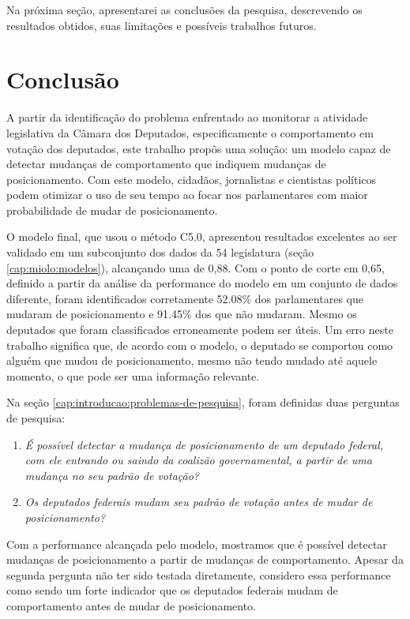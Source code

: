 \documentclass[a4paper,titlepage]{ppgi}\usepackage[]{graphicx}\usepackage[]{color}
\begin{document}
Na próxima seção, apresentarei as conclusões da pesquisa, descrevendo os
resultados obtidos, suas limitações e possíveis trabalhos futuros.

\chapter{Conclusão}\label{cap:conclusao}

A partir da identificação do problema enfrentado ao monitorar a atividade
legislativa da Câmara dos Deputados, especificamente o comportamento em votação
dos deputados, este trabalho propôs uma solução: um modelo capaz de detectar
mudanças de comportamento que indiquem mudanças de posicionamento. Com este
modelo, cidadãos, jornalistas e cientistas políticos podem otimizar o uso de
seu tempo ao focar nos parlamentares com maior probabilidade de mudar de
posicionamento.

O modelo final, que usou o método C5.0, apresentou resultados excelentes ao ser
validado em um subconjunto dos dados da 54\textordfeminine{} legislatura (seção
\ref{cap:miolo:modelos}), alcançando uma  de
0,88. Com o ponto de corte em
0,65, definido a partir da análise da performance do modelo em
um conjunto de dados diferente, foram identificados corretamente
52.08\% dos parlamentares
que mudaram de posicionamento e
91.45\% dos que não
mudaram. Mesmo os deputados que foram classificados erroneamente podem ser
úteis. Um erro neste trabalho significa que, de acordo com o modelo, o deputado
se comportou como alguém que mudou de posicionamento, mesmo não tendo mudado
até aquele momento, o que pode ser uma informação relevante.

Na seção \ref{cap:introducao:problemas-de-pesquisa}, foram definidas duas
perguntas de pesquisa:

\begin{enumerate}
\item \emph{É possível detectar a mudança de posicionamento de um deputado federal,
com ele entrando ou saindo da coalizão governamental, a partir de uma mudança
no seu padrão de votação?}
\item \emph{Os deputados federais mudam seu padrão de votação antes de mudar de
posicionamento?}
\end{enumerate}

Com a performance alcançada pelo modelo, mostramos que é possível detectar
mudanças de posicionamento a partir de mudanças de comportamento. Apesar da
segunda pergunta não ter sido testada diretamente, considero essa performance
como sendo um forte indicador que os deputados federais mudam de comportamento
antes de mudar de posicionamento.
\end{document}
